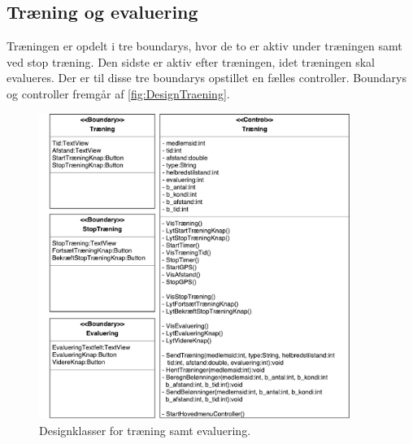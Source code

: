 \subsection*{Træning og evaluering}
Træningen er opdelt i tre boundarys, hvor de to er aktiv under træningen samt ved stop træning. Den sidste er aktiv efter træningen, idet træningen skal evalueres. Der er til disse tre boundarys opstillet en fælles controller. Boundarys og controller fremgår af \autoref{fig:DesignTraening}. 

\begin{figure} [H]
\centering
\includegraphics[width=0.9\textwidth]{figures/MVC/MVCTraening}
\caption{Designklasser for træning samt evaluering.}
\label{fig:DesignTraening}
\end{figure}

